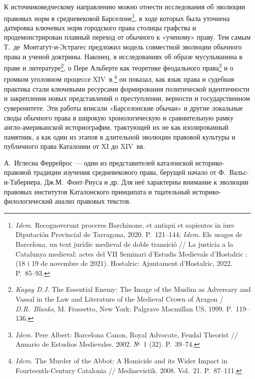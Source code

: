 К источниковедческому направлению можно отнести исследования об эволюции правовых норм в средневековой Барселоне\footnote{\emph{Idem.} Recognoverunt proceres Barchinone, et antiqui et sapientes in iure Diputación Provincial de Tarragona, 2020. P.~121--144;\emph{ Idem.} Els usages de Barcelona, un text jurídic medieval de doble transició // La justícia a la Catalunya medieval: actes del VII Seminari d'Estudis Medievals d'Hostalric : (18 i 19 de novembre de 2021). Hostalric: Ajuntament d'Hostalric, 2022. P.~85--93.}, в ходе которых была уточнена датировка ключевых норм городского права столицы графства и продемонстрирован плавный переход от обычного к «ученому» праву. Тем самым Т.~де~Монтагут-и-Эстрагес предложил модель совместной эволюции обычного права и ученой доктрины. Наконец, в исследованиях об образе мусульманина в праве и литературе\footnote{\emph{Kagay D.J.} The Essential Enemy: The Image of the Muslim as Adversary and Vassal in the Law and Literature of the Medieval Crown of Aragon / \emph{D.R.~Blanks}, M. Frassetto, New York: Palgrave Macmillan US, 1999. P.~119--136.}, о Пере Альберте как теоретике феодального права\footnote{\emph{Idem. }Pere Albert: Barcelona Canon, Royal Advocate, Feudal Theorist // Anuario de Estudios Medievales. 2002. №~1 (32). P.~39--74.} и о громком уголовном процессе XIV~в.\footnote{\emph{Idem.}\emph{ }The Murder of the Abbot: A Homicide and its Wider Impact in Fourteenth-Century Catalonia // Mediaevistik. 2008. Vol.~21. P.~87--111.} он показал, как язык права и судебная практика стали ключевыми ресурсами формирования политической идентичности и закрепления новых представлений о преступлении, верности и государственном суверенитете. Эти работы вписали «Барселонские обычаи» и другие локальные своды обычного права в широкую хронологическую и сравнительную рамку англо-американской историографии, трактующей их не как изолированный памятник, а как один из этапов в длительной эволюции правовой культуры и публичного права Каталонии от XI до XIV~вв.

А.~Иглесиа Феррейрос --- один из представителей каталонской историко-правовой традиции изучения средневекового права, берущей начало от Ф.~Вальс-и-Табернера, Дж.М.~Фонт-Риуса и др. Для неё характерны внимание к эволюции правовых институтов Каталонского принципата и тщательный историко-филологический анализ правовых текстов.

